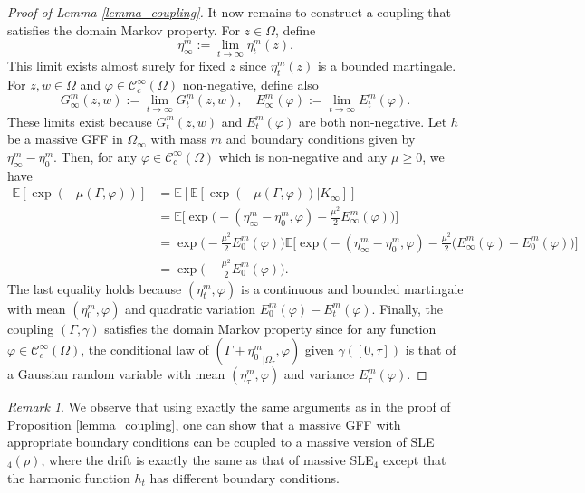 \documentclass{article}
\newcommand{\EE}{{\mathbb{E}}}
\theoremstyle{definition}
\theoremstyle{remark}
\newtheorem{remark}[theorem]{Remark}
\theoremstyle{remark}
\begin{document}
\begin{proof}[Proof of Lemma \ref{lemma_coupling}]
    It now remains to construct a coupling that satisfies the domain Markov property. For $z \in \Omega$, define
    \begin{equation*}
        \eta_{\infty}^{m} := \lim_{t \to \infty} \eta_{t}^{m}(z).
    \end{equation*}
    This limit exists almost surely for fixed $z$ since $\eta_{t}^{m}(z)$ is a bounded martingale. For $z, w \in \Omega$ and $\varphi \in \mathcal{C}_c^{\infty}(\Omega)$ non-negative, define also
    \begin{equation*}
        G_{\infty}^{m}(z,w) := \lim_{t \to \infty} G_t^{m}(z,w), \quad E_{\infty}^m(\varphi) := \lim_{t \to \infty} E_t^m(\varphi).
    \end{equation*}
    These limits exist because $G_t^{m}(z,w)$ and $E_t^m(\varphi)$ are both non-negative. Let $h$ be a massive GFF in $\Omega_{\infty}$ with mass $m$ and boundary conditions given by $\eta_{\infty}^m - \eta_0^m$. Then, for any $\varphi \in \mathcal{C}_c^{\infty}(\Omega)$ which is non-negative and any $\mu \geq 0$, we have
    \begin{align*}
        \EE[\exp(-\mu(\Gamma, \varphi))] &= \EE[\EE[\exp(-\mu(\Gamma, \varphi)) \vert K_{\infty}]] \\
        &= \EE \bigg[ \exp \bigg(- (\eta_{\infty}^m - \eta_0^m, \varphi) -\frac{\mu^2}{2} E_{\infty}^m(\varphi) \bigg)\bigg] \\
        &= \exp \bigg( -\frac{\mu^2}{2} E_0^m(\varphi)\bigg) \EE \bigg[ \exp \bigg(- (\eta_{\infty}^m - \eta_0^m, \varphi) -\frac{\mu^2}{2} (E_{\infty}^m(\varphi) - E_0^m(\varphi) \bigg)\bigg] \\
        &= \exp \bigg( -\frac{\mu^2}{2} E_0^m(\varphi)\bigg).
    \end{align*}
    The last equality holds because $(\eta_t^{m}, \varphi)$ is a continuous and bounded martingale with mean $(\eta_0^{m}, \varphi)$ and quadratic variation $E_0^m(\varphi) - E_t^m(\varphi)$. Finally, the coupling $(\Gamma, \gamma)$ satisfies the domain Markov property since for any function $\varphi \in \mathcal{C}_{c}^{\infty}(\Omega)$, the conditional law of $(\Gamma+{\eta_0^m}_{\vert \Omega_\tau}, \varphi)$ given $\gamma([0,\tau])$ is that of a Gaussian random variable with mean $(\eta_{\tau}^m, \varphi)$ and variance $E_{\tau}^m(\varphi)$.
\end{proof}

\begin{remark}
We observe that using exactly the same arguments as in the proof of Proposition \ref{lemma_coupling}, one can show that a massive GFF with appropriate boundary conditions can be coupled to a massive version of SLE$_4(\rho)$, where the drift is exactly the same as that of massive SLE$_4$ except that the harmonic function $h_t$ has different boundary conditions.
\end{remark}


\end{document}
